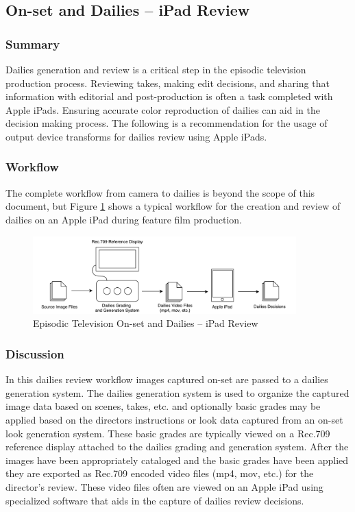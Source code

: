 \subsection{On-set and Dailies -- iPad Review} \label{subsec:tv-onset-dailies-ipad}

	\subsubsection{Summary}
	
	Dailies generation and review is a critical step in the episodic television production process.  Reviewing takes, making edit decisions, and sharing that information with editorial and post-production is often a task completed with Apple iPads.  Ensuring accurate color reproduction of dailies can aid in the decision making process. The following is a recommendation for the usage of output device transforms for dailies review using Apple iPads.
	
	\subsubsection{Workflow}
	
	The complete workflow from camera to dailies is beyond the scope of this document, but Figure \ref{fig:workflow10} shows a typical workflow for the creation and review of dailies on an Apple iPad during feature film production.
	
	\begin{figure}[ht!]
	\centering
	    \includegraphics[width=4in]{images/workflows/workflow_tv-onset-dailies-ipad.pdf}
	    \caption{\small Episodic Television On-set and Dailies -- iPad Review}
	    \label{fig:workflow10}
	\end{figure}	
	\subsubsection{Discussion}
	
	In this dailies review workflow images captured on-set are passed to a dailies generation system.  The dailies generation system is used to organize the captured image data based on scenes, takes, etc. and optionally basic grades may be applied based on the directors instructions or look data captured from an on-set look generation system. These basic grades are typically viewed on a Rec.709 reference display attached to the dailies grading and generation system.  After the images have been appropriately cataloged and the basic grades have been applied they are exported as Rec.709 encoded video files (mp4, mov, etc.) for the director's review.  These video files often are viewed on an Apple iPad using specialized software that aids in the capture of dailies review decisions.
	
